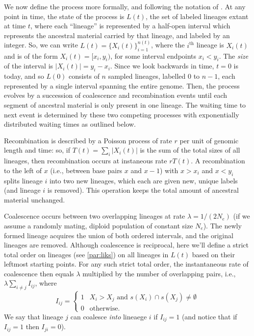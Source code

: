 \documentclass{article}
\begin{document}
We now define the process more formally,
and following the notation of \citet{mcvean_approximating_2005}.
At any point in time, the state of the process is $L(t)$,
the set of labeled lineages extant at time $t$,
where each ``lineage'' is represented by a half-open interval
which represents the ancestral material carried by that lineage,
and labeled by an integer.
So, we can write $L(t) = \{X_i(t)\}_{i=1}^{n(t)}$,
where the $i^\text{th}$ lineage is $X_i(t)$
and is of the form
$X_i(t) = [x_{i}, y_{i})$,
for some interval endpoints $x_{i} < y_{i}$.
The \emph{size} of the interval is $|X_i(t)| = y_{i} - x_{i}$.
Since we look backwards in time, $t=0$ is today, and so
$L(0)$ consists of $n$ sampled lineages, labelled $0$ to $n-1$,
each represented by a single interval spanning the entire genome.
Then, the process evolves by a succession of coalescence and recombination
events until each segment of ancestral material is only present in one lineage.
The waiting time to next event is determined by these two competing processes
with exponentially distributed waiting times as outlined below.

Recombination is described by a Poisson process of rate $r$ per unit of genomic length and time:
so, if $T(t) = \sum_i |X_i(t)|$ is the sum of the total sizes of all lineages,
then recombination occurs at instaneous rate $rT(t)$.
A recombination to the left of $x$
(i.e., between base pairs $x$ and $x-1$)
with $x>x_{i}$ and $x<y_{i}$ splits lineage $i$ into two new lineages,
which each are given new, unique labels
(and lineage $i$ is removed).
This operation keeps the total amount of ancestral material unchanged.

Coalescence occurs between
two overlapping lineages at rate $\lambda = 1/(2N_e)$
(if we assume a randomly mating, diploid population of constant size $N_e$).
The newly formed lineage acquires the union of both ordered intervals, %
and the original lineages are removed.
Although coalescence is reciprocal, here we'll define a strict total order on lineages
(see \ref{par:liks}) on all lineages in $L(t)$ based on their leftmost starting points.
For any such strict total order,
the instantaneous rate of coalescence then equals $\lambda$ multiplied by the number of overlapping pairs,
i.e., $\lambda \sum_{i \neq j} I_{ij}$,
where
\begin{equation} \label{def:coal}
I_{ij} = \begin{cases}
    1 & X_i > X_j \text{ and } s(X_i) \cap s(X_j) \neq \emptyset \\
    0 & \text{otherwise.}
\end{cases}
\end{equation}
We say that lineage $j$ can coalesce \emph{into} lineaege $i$ if $I_{ij} = 1$
(and notice that if $I_{ij} = 1$ then $I_{ji} = 0$).
\end{document}

